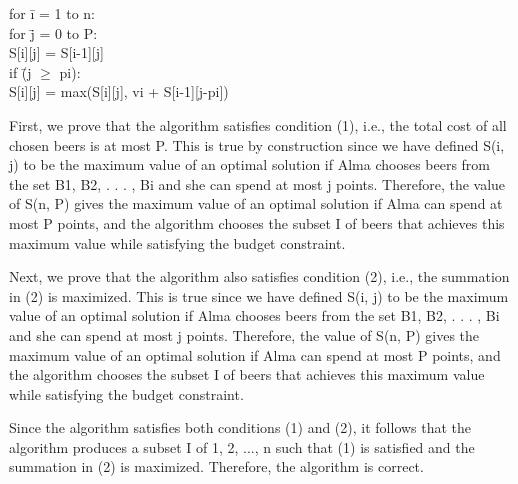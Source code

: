\documentclass[12pt]{article}
\newenvironment{solution}{{\noindent\bf Solution:}}{\vspace{5mm}}
\begin{document}
\begin{solution}
\begin{tabbing}
            for \= i = 1 to n: \\
      
            \> for \= j = 0 to P: \\
      
            \> \> S[i][j] = S[i-1][j] \\
      
            \> \> if \= (j $\geq$ pi): \\
            
            \> \> \> S[i][j] = max(S[i][j], vi + S[i-1][j-pi])            
      \end{tabbing}

      First, we prove that the algorithm satisfies condition (1), i.e., the total cost of all chosen beers is at most P. This is true by construction since we have defined S(i, j) to be the maximum value of an optimal solution if Alma chooses beers from the set {B1, B2, . . . , Bi} and she can spend at most j points. Therefore, the value of S(n, P) gives the maximum value of an optimal solution if Alma can spend at most P points, and the algorithm chooses the subset I of beers that achieves this maximum value while satisfying the budget constraint.

      Next, we prove that the algorithm also satisfies condition (2), i.e., the summation in (2) is maximized. This is true since we have defined S(i, j) to be the maximum value of an optimal solution if Alma chooses beers from the set {B1, B2, . . . , Bi} and she can spend at most j points. Therefore, the value of S(n, P) gives the maximum value of an optimal solution if Alma can spend at most P points, and the algorithm chooses the subset I of beers that achieves this maximum value while satisfying the budget constraint.

      Since the algorithm satisfies both conditions (1) and (2), it follows that the algorithm produces a subset I of {1, 2, ..., n} such that (1) is satisfied and the summation in (2) is maximized. Therefore, the algorithm is correct.

\end{solution}
\end{document}
